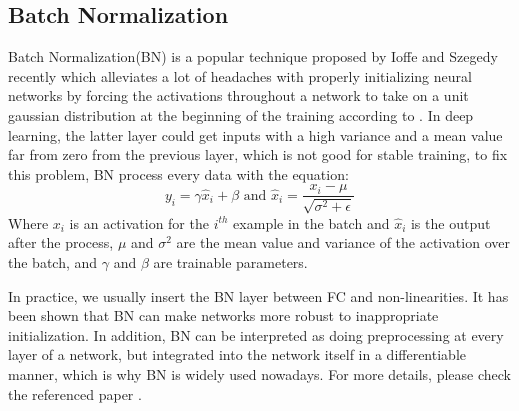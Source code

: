 \subsection{Batch Normalization}
\label{sec:BN}
Batch Normalization(BN) is a popular technique proposed by Ioffe and Szegedy \cite{ioffe2015batch} recently 
which alleviates a lot of headaches with properly initializing neural networks by forcing 
the activations throughout a network 
to take on a unit gaussian distribution at the beginning of the training according to \cite{cs231n}.
In deep learning, the latter layer could get inputs with a high variance and a mean value far from zero from the previous layer,
which is not good for stable training, to fix this problem, BN process every data with the equation:
$$y_{i}=\gamma \hat{x}_{i}+\beta \text { and } \hat{x}_{i}=\frac{x_{i}-\mu}{\sqrt{\sigma^{2}+\epsilon}}$$
Where $x_{i}$ is an activation for the $i^{th}$ example in the batch and $\hat{x}_{i}$ is the output after 
the process, $\mu$ and $\sigma^{2}$ are the mean value and variance of the activation over the batch, and
$\gamma$ and $\beta$ are trainable parameters.

In practice, we usually insert the BN layer between FC and non-linearities.
It has been shown that BN can make networks more robust to inappropriate
initialization. In addition, BN can be interpreted as doing preprocessing at every layer of a network, but 
integrated into the network itself in a differentiable manner, which is why BN is widely used nowadays.
For more details, please check the referenced paper \cite{ioffe2015batch}.

